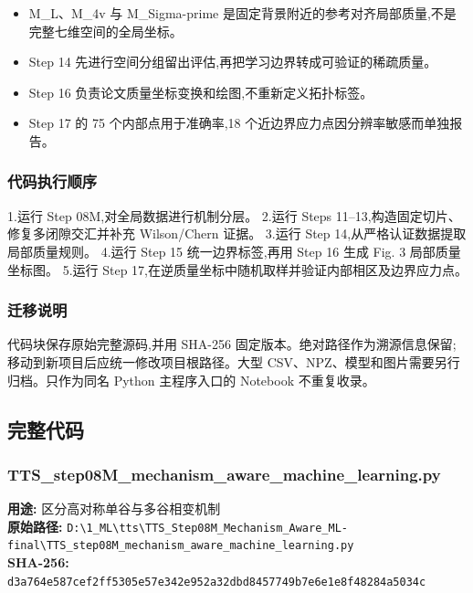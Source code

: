 \documentclass[lang=cn,scheme=chinese,color=blue,device=normal,toc=onecol,math=cm]{elegantbook}
\begin{document}
\begin{itemize}
\item M\_\allowbreak{}L、M\_\allowbreak{}4v 与 M\_\allowbreak{}Sigma-prime 是固定背景附近的参考对齐局部质量,不是完整七维空间的全局坐标。
\item Step 14 先进行空间分组留出评估,再把学习边界转成可验证的稀疏质量。
\item Step 16 负责论文质量坐标变换和绘图,不重新定义拓扑标签。
\item Step 17 的 75 个内部点用于准确率,18 个近边界应力点因分辨率敏感而单独报告。
\end{itemize}


\subsubsection{代码执行顺序}


1.运行 Step 08M,对全局数据进行机制分层。 2.运行 Steps 11–13,构造固定切片、修复多闭隙交汇并补充 Wilson/\allowbreak{}Chern 证据。 3.运行 Step 14,从严格认证数据提取局部质量规则。 4.运行 Step 15 统一边界标签,再用 Step 16 生成 Fig. 3 局部质量坐标图。 5.运行 Step 17,在逆质量坐标中随机取样并验证内部相区及边界应力点。\par


\subsubsection{迁移说明}


代码块保存原始完整源码,并用 SHA-256 固定版本。绝对路径作为溯源信息保留;移动到新项目后应统一修改项目根路径。大型 CSV、NPZ、模型和图片需要另行归档。只作为同名 Python 主程序入口的 Notebook 不重复收录。\par


\subsection{完整代码}


\subsubsection{TTS\_\allowbreak{}step08M\_\allowbreak{}mechanism\_\allowbreak{}aware\_\allowbreak{}machine\_\allowbreak{}learning.py}


\textbf{用途:} 区分高对称单谷与多谷相变机制\\ \textbf{原始路径:} \texttt{D:\textbackslash{}\allowbreak{}1\_\allowbreak{}ML\textbackslash{}\allowbreak{}tts\textbackslash{}\allowbreak{}TTS\_\allowbreak{}Step08M\_\allowbreak{}Mechanism\_\allowbreak{}Aware\_\allowbreak{}ML-final\textbackslash{}\allowbreak{}TTS\_\allowbreak{}step08M\_\allowbreak{}mechanism\_\allowbreak{}aware\_\allowbreak{}machine\_\allowbreak{}learning.py}\\ \textbf{SHA-256:} \texttt{d3a764e587cef2ff5305e57e342e952a32dbd8457749b7e6e1e8f48284a5034c}\par
\end{document}
